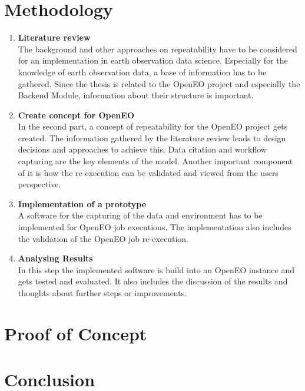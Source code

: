\documentclass[draft,final]{vutinfth} %
\begin{document}
\chapter{Methodology}
\begin{enumerate}
	\item \textbf{Literature review} \\
	The background and other approaches on repeatability have to be considered for an implementation in earth observation data science. Especially for the knowledge of earth observation data, a base of information has to be gathered. Since the thesis is related to the OpenEO project and especially the Backend Module, information about their structure is important. 
	\item\textbf{Create concept for OpenEO} \\
	In the second part, a concept of repeatability for the OpenEO project gets created. The information gathered by the literature review leads to design decisions and approaches to achieve this. Data citation and workflow capturing are the key elements of the model. Another important component of it is how the re-execution can be validated and viewed from the users perspective.
	\item \textbf{Implementation of a prototype} \\
	A software for the capturing of the data and environment has to be implemented for OpenEO job executions. The implementation also includes the validation of the OpenEO job re-execution.
	\item \textbf{Analysing Results} \\
	In this step the implemented software is build into an OpenEO instance and gets tested and evaluated. It also includes the discussion of the results and thoughts about further steps or improvements.
\end{enumerate}
\chapter{Proof of Concept}


\chapter{Conclusion}

\end{document}

